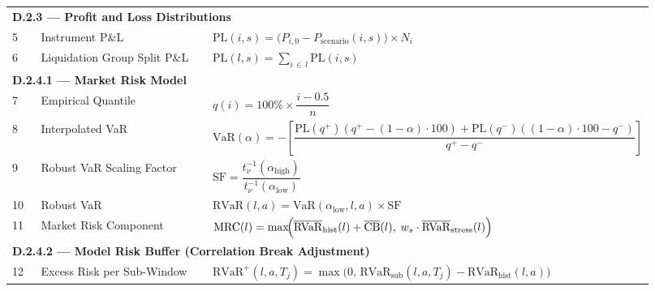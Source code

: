 \documentclass[9pt, a4paper]{extarticle}
\begin{document}
\begin{longtable}{p{0.05\linewidth} p{0.35\linewidth} p{0.52\linewidth}}

\multicolumn{3}{l}{\textbf{D.2.3 — Profit and Loss Distributions}} \\[2pt]

5
    & Instrument P\&L
    & $\displaystyle \mathrm{PL}(i,s) =
       \bigl(P_{i,0} - P_{\mathrm{scenario}}(i,s)\bigr) \times N_i$ \\[6pt]

6
    & Liquidation Group Split P\&L
    & $\displaystyle \mathrm{PL}(l,s) = \sum_{i \,\in\, l} \mathrm{PL}(i,s)$ \\[6pt]


\multicolumn{3}{l}{\textbf{D.2.4.1 — Market Risk Model}} \\[2pt]

7
    & Empirical Quantile
    & $\displaystyle q(i) = 100\% \times \dfrac{i-0.5}{n}$ \\[8pt]

8
    & Interpolated VaR
    & $\displaystyle \mathrm{VaR}(\alpha) = -\left[
       \dfrac{\mathrm{PL}(q^{+})(q^{+}-(1-\alpha){\cdot}100)
            + \mathrm{PL}(q^{-})((1-\alpha){\cdot}100 - q^{-})}
             {q^{+} - q^{-}}
      \right]$ \\[8pt]

9
    & Robust VaR Scaling Factor
    & $\displaystyle \mathrm{SF} =
       \dfrac{t_{\nu}^{-1}(\alpha_{\mathrm{high}})}
             {t_{\nu}^{-1}(\alpha_{\mathrm{low}})}$ \\[8pt]

10
    & Robust VaR
    & $\displaystyle \mathrm{RVaR}(l,a) =
       \mathrm{VaR}(\alpha_{\mathrm{low}},l,a) \times \mathrm{SF}$ \\[6pt]

11
    & Market Risk Component
    & $\displaystyle \mathrm{MRC}(l) = \max\!\Bigl(
       \overline{\mathrm{RVaR}}_{\mathrm{hist}}(l) + \overline{\mathrm{CB}}(l),\;
       w_s \cdot \overline{\mathrm{RVaR}}_{\mathrm{stress}}(l)
      \Bigr)$ \\[6pt]


\multicolumn{3}{l}{\textbf{D.2.4.2 — Model Risk Buffer (Correlation Break Adjustment)}} \\[2pt]

12
    & Excess Risk per Sub-Window
    & $\displaystyle \mathrm{RVaR}^{+}(l,a,T_j) =
       \max\!\bigl(0,\,
         \mathrm{RVaR}_{\mathrm{sub}}(l,a,T_j) - \mathrm{RVaR}_{\mathrm{hist}}(l,a)
       \bigr)$ \\[6pt]


\end{longtable}
\end{document}
